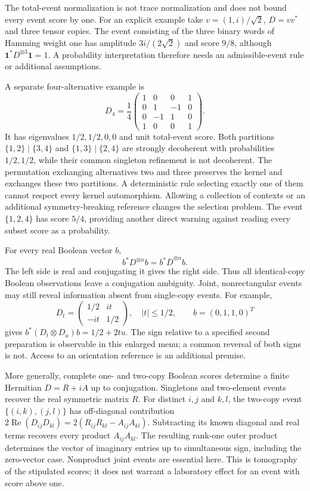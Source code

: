 The total-event normalization is not trace normalization and does not bound every event score by one. For an explicit example take $v=(1,i)/\sqrt2$, $D=vv^*$ and three tensor copies. The event consisting of the three binary words of Hamming weight one has amplitude $3i/(2\sqrt2)$ and score $9/8$, although $\mathbf1^*D^{\otimes3}\mathbf1=1$. A probability interpretation therefore needs an admissible-event rule or additional assumptions.

A separate four-alternative example is
\[
 D_4=\frac14\begin{pmatrix}1&0&0&1\\0&1&-1&0\\0&-1&1&0\\1&0&0&1\end{pmatrix}.
\]
It has eigenvalues $1/2,1/2,0,0$ and unit total-event score. Both partitions
$\{1,2\}\mid\{3,4\}$ and $\{1,3\}\mid\{2,4\}$ are strongly decoherent with probabilities $1/2,1/2$, while their common singleton refinement is not decoherent. The permutation exchanging alternatives two and three preserves the kernel and exchanges these two partitions. A deterministic rule selecting exactly one of them cannot respect every kernel automorphism. Allowing a collection of contexts or an additional symmetry-breaking reference changes the selection problem. The event $\{1,2,4\}$ has score $5/4$, providing another direct warning against reading every subset score as a probability.

For every real Boolean vector $b$,
\[
 b^*D^{\otimes n}b=b^*\overline D^{\otimes n}b.
\]
The left side is real and conjugating it gives the right side. Thus all identical-copy Boolean observations leave a conjugation ambiguity. Joint, nonrectangular events may still reveal information absent from single-copy events. For example,
\[
 D_t=\begin{pmatrix}1/2&it\\-it&1/2\end{pmatrix},\quad |t|\le1/2,
 \qquad b=(0,1,1,0)^T
\]
gives $b^*(D_t\otimes D_u)b=1/2+2tu$. The sign relative to a specified second preparation is observable in this enlarged menu; a common reversal of both signs is not. Access to an orientation reference is an additional premise.

More generally, complete one- and two-copy Boolean scores determine a finite Hermitian $D=R+iA$ up to conjugation. Singletons and two-element events recover the real symmetric matrix $R$. For distinct $i,j$ and $k,l$, the two-copy event $\{(i,k),(j,l)\}$ has off-diagonal contribution
$2\operatorname{Re}(D_{ij}D_{kl})=2(R_{ij}R_{kl}-A_{ij}A_{kl})$.
Subtracting its known diagonal and real terms recovers every product $A_{ij}A_{kl}$. The resulting rank-one outer product determines the vector of imaginary entries up to simultaneous sign, including the zero-vector case. Nonproduct joint events are essential here. This is tomography of the stipulated scores; it does not warrant a laboratory effect for an event with score above one.

